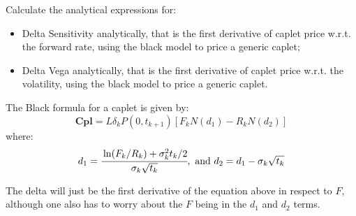 \documentclass[12pt,a4paper]{book}
\begin{document}
\begin{exercise}[subtitle=Vega]
Calculate the analytical expressions for:
\begin{itemize}
\item Delta Sensitivity analytically, that is the first derivative of caplet price w.r.t. the forward rate, using the black model to price a generic caplet;
\item Delta Vega analytically, that is the first derivative of caplet price w.r.t. the volatility, using the black model to price a generic caplet.
\end{itemize}
\end{exercise}

\begin{solution}
The Black formula for a caplet is given by:
\begin{equation*}
\textbf{Cpl} = L\delta_k P(0,t_{k+1})[F_k N(d_1)-R_k N(d_2)]
\end{equation*}
where:
\begin{equation*}
d_1 =\cfrac{\ln(F_k/R_k)+\sigma^2_k t_k/2}{\sigma_k \sqrt{t_k}},\text{ and } d_2 = d_1-\sigma_k \sqrt{t_k}
\end{equation*}

The delta will just be the first derivative of the equation above in respect to $F$, although one also has to worry about the $F$ being in the $d_1$ and $d_2$ terms.


\end{solution}
\end{document}
